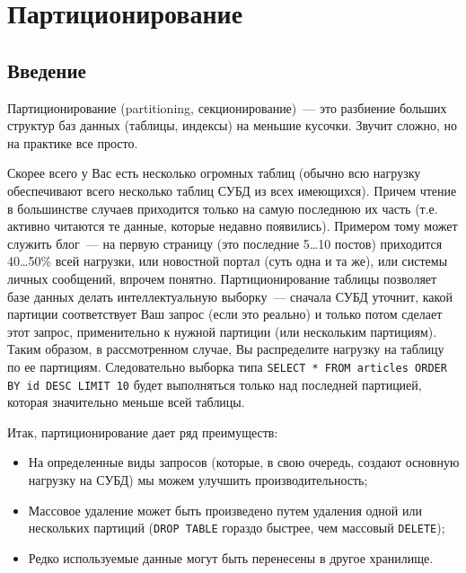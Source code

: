 \chapter{Партиционирование}

\begin{epigraphs}
\end{epigraphs}

\section{Введение}

Партиционирование (partitioning, секционирование)~--- это разбиение больших структур баз данных (таблицы, индексы) на меньшие кусочки. Звучит сложно, но на практике все просто.

Скорее всего у Вас есть несколько огромных таблиц (обычно всю нагрузку обеспечивают всего несколько таблиц СУБД из всех имеющихся). Причем чтение в большинстве случаев приходится только на самую последнюю их часть (т.е. активно читаются те данные, которые недавно появились). Примером тому может служить блог~--- на первую страницу (это последние 5\dots10 постов) приходится 40\dots50\% всей нагрузки, или новостной портал (суть одна и та же), или системы личных сообщений, впрочем понятно. Партиционирование таблицы позволяет базе данных делать интеллектуальную выборку~--- сначала СУБД уточнит, какой партиции соответствует Ваш запрос (если это реально) и только потом сделает этот запрос, применительно к нужной партиции (или нескольким партициям). Таким образом, в рассмотренном случае, Вы распределите нагрузку на таблицу по ее партициям. Следовательно выборка типа \lstinline!SELECT * FROM articles ORDER BY id DESC LIMIT 10! будет выполняться только над последней партицией, которая значительно меньше всей таблицы.

Итак, партиционирование дает ряд преимуществ:

\begin{itemize}
  \item На определенные виды запросов (которые, в свою очередь, создают основную нагрузку на СУБД) мы можем улучшить производительность;
  \item Массовое удаление может быть произведено путем удаления одной или нескольких партиций (\lstinline!DROP TABLE! гораздо быстрее, чем массовый \lstinline!DELETE!);
  \item Редко используемые данные могут быть перенесены в другое хранилище.
\end{itemize}

